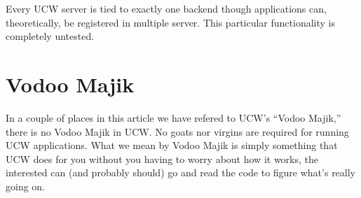 \documentclass[a4paper]{article}
\newcommand{\ucw}{\textsc{UCW}}
\begin{document}
Every \ucw{} server is tied to exactly one backend though applications
can, theoretically, be registered in multiple server. This particular
functionality is completely untested.

\section{Vodoo Majik}

In a couple of places in this article we have refered to \ucw{}'s
``Vodoo Majik,'' there is no Vodoo Majik in \ucw{}. No goats nor
virgins are required for running \ucw{} applications. What we mean by
Vodoo Majik is simply something that \ucw{} does for you without you
having to worry about how it works, the interested can (and probably
should) go and read the code to figure what's really going on.
\end{document}
